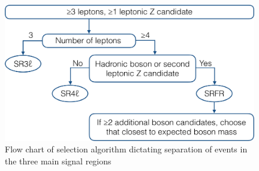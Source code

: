 \begin{figure}[tbp]
  \begin{center}
    \includegraphics[width=0.98\textwidth]{figs/rpvthreel/3LRPVSchematic.png}
  \end{center}
  \caption[Signal region flow chart]
          {Flow chart of selection algorithm dictating separation of events in the three main signal regions\cite{ATLAS:2020uer}}
          \label{fig:schematic}
\end{figure}


